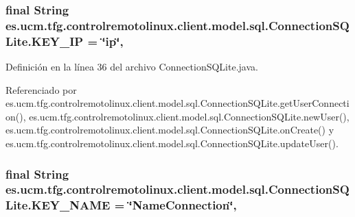 \hypertarget{classes_1_1ucm_1_1tfg_1_1controlremotolinux_1_1client_1_1model_1_1sql_1_1ConnectionSQLite_a0efee646633ea8e4545b0e2a19ab04d9}{
\subsubsection[{K\-E\-Y\-\_\-\-I\-P}]{\setlength{\rightskip}{0pt plus 5cm}final String es.\-ucm.\-tfg.\-controlremotolinux.\-client.\-model.\-sql.\-Connection\-S\-Q\-Lite.\-K\-E\-Y\-\_\-\-I\-P = \char`\"{}ip\char`\"{}\hspace{0.3cm}{\ttfamily [static]}, {\ttfamily [private]}}}\label{classes_1_1ucm_1_1tfg_1_1controlremotolinux_1_1client_1_1model_1_1sql_1_1ConnectionSQLite_a0efee646633ea8e4545b0e2a19ab04d9}


Definición en la línea 36 del archivo Connection\-S\-Q\-Lite.\-java.



Referenciado por es.\-ucm.\-tfg.\-controlremotolinux.\-client.\-model.\-sql.\-Connection\-S\-Q\-Lite.\-get\-User\-Connection(), es.\-ucm.\-tfg.\-controlremotolinux.\-client.\-model.\-sql.\-Connection\-S\-Q\-Lite.\-new\-User(), es.\-ucm.\-tfg.\-controlremotolinux.\-client.\-model.\-sql.\-Connection\-S\-Q\-Lite.\-on\-Create() y es.\-ucm.\-tfg.\-controlremotolinux.\-client.\-model.\-sql.\-Connection\-S\-Q\-Lite.\-update\-User().

\hypertarget{classes_1_1ucm_1_1tfg_1_1controlremotolinux_1_1client_1_1model_1_1sql_1_1ConnectionSQLite_a50ffe039afb29158bc27b53f94395efc}{
\subsubsection[{K\-E\-Y\-\_\-\-N\-A\-M\-E}]{\setlength{\rightskip}{0pt plus 5cm}final String es.\-ucm.\-tfg.\-controlremotolinux.\-client.\-model.\-sql.\-Connection\-S\-Q\-Lite.\-K\-E\-Y\-\_\-\-N\-A\-M\-E = \char`\"{}Name\-Connection\char`\"{}\hspace{0.3cm}{\ttfamily [static]}, {\ttfamily [private]}}}\label{classes_1_1ucm_1_1tfg_1_1controlremotolinux_1_1client_1_1model_1_1sql_1_1ConnectionSQLite_a50ffe039afb29158bc27b53f94395efc}


